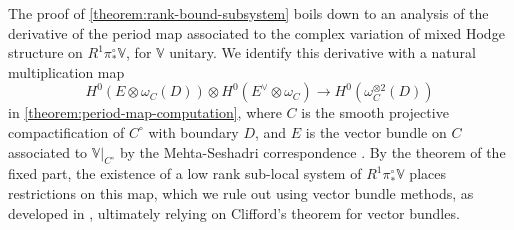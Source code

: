 The proof of
\autoref{theorem:rank-bound-subsystem} boils down to an analysis of the derivative of the period map associated to the complex variation of mixed Hodge structure on $R^1\pi^\circ_*\mathbb{V}$, for $\mathbb{V}$ unitary.
We identify this derivative with a natural multiplication map $$H^0(E\otimes \omega_C(D))\otimes H^0(E^\vee\otimes \omega_C)\to H^0(\omega_C^{\otimes 2}(D))$$ in
\autoref{theorem:period-map-computation}, where $C$ is the smooth projective compactification of $C^\circ$ with boundary $D$, and $E$ is the vector bundle on $C$ associated to $\mathbb{V}|_{C^\circ}$ by the Mehta-Seshadri correspondence \cite{mehta1980moduli}. By the theorem of the fixed part, the existence of a low rank sub-local system of $R^1\pi_*^\circ\mathbb{V}$ places restrictions on this map, which we rule out
 using vector bundle methods,
as developed in \cite[\S6]{LL:geometric-local-systems},
ultimately relying on Clifford's theorem for vector bundles.

